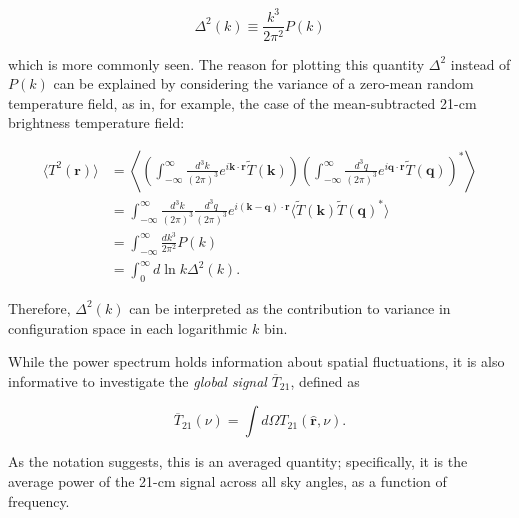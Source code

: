 \documentclass[floats,floatfix,showpacs,amssymb,prd,superscriptaddress,nofootinbib]{revtex4-2} %
\newcommand{\red}{\textcolor{red}}
\begin{document}
\begin{equation}
    \Delta^2 (k) \equiv \frac{k^3}{2\pi^2} P(k)
\end{equation}

\noindent which is more commonly seen. The reason for plotting this quantity $\Delta^2$ instead of $P(k)$ can be explained by considering the variance of a zero-mean random temperature field, as in, for example, the case of the mean-subtracted 21-cm brightness temperature field:

\begin{equation}
\begin{split}
    \langle T^2 (\textbf{r}) \rangle
    & = \left\langle \left( \int^\infty _{-\infty} \frac{d^3 k}{(2\pi)^3} e^{i \textbf{k} \cdot \textbf{r}} \tilde{T} (\textbf{k}) \right) \left( \int^\infty _{-\infty} \frac{d^3 q}{(2\pi)^3} e^{i \textbf{q} \cdot \textbf{r}} \tilde{T} (\textbf{q}) \right)^{*} \right\rangle \\
    & = \int^\infty _{-\infty} \frac{d^3 k}{(2\pi)^3} \frac{d^3 q}{(2\pi)^3} e^{i (\textbf{k} - \textbf{q}) \cdot \textbf{r}} \langle \tilde{T} (\textbf{k}) \tilde{T} (\textbf{q})^{*} \rangle \\
    & = \int^\infty _{-\infty} \frac{dk^3}{2\pi^2} P(k) \\
    & = \int^\infty _{0} d \ln k \Delta^2 (k).
\end{split}
\end{equation}

\noindent Therefore, $\Delta^2 (k)$ can be interpreted as the contribution to variance in configuration space in each logarithmic $k$ bin.

While the power spectrum holds information about spatial fluctuations, it is also informative to investigate the \textit{global signal} $\overline{T}_{21}$, defined as 

\begin{equation}
    \overline{T}_{21} (\nu) = \int d\Omega T_{21} (\hat{\textbf{r}}, \nu).
    \label{eq:global_signal}
\end{equation}

\noindent As the notation suggests, this is an averaged quantity; specifically, it is the average power of the 21-cm signal across all sky angles, as a function of frequency.


\end{document}
